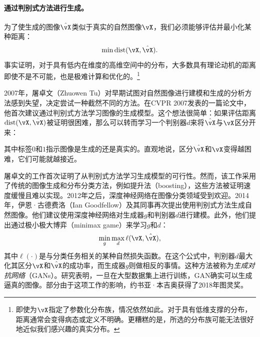 \documentclass[../../book-main_zh.tex]{subfiles}
\begin{document}
\paragraph{通过判别式方法进行生成。}
为了使生成的图像\(\hat{\vX}\)类似于真实的自然图像\(\vX\)，我们必须能够评估并最小化某种距离：
\begin{equation}
    \min \operatorname{dist}(\vX, \hat{\vX}).
\end{equation}
事实证明，对于具有低内在维度的高维空间中的分布，大多数具有理论动机的距离即使不是不可能，也是极难计算和优化的。\footnote{即使为\(\vX\)指定了参数化分布族，情况依然如此。对于具有低维支撑的分布，距离通常会变得病态或定义不明确。更糟糕的是，所选的分布族可能无法很好地近似我们感兴趣的真实分布。}

2007年，屠卓文（Zhuowen Tu）对早期试图对自然图像进行建模和生成的分析方法感到失望，决定尝试一种截然不同的方法。在CVPR
2007发表的一篇论文中\cite{Tu-2007}，他首次建议通过判别式方法学习图像的生成模型。这个想法很简单：如果评估距离\(\operatorname{dist}(\vX,
\hat{\vX})\)被证明很困难，那么可以转而学习一个判别器\(d\)来将\(\hat{\vX}\)与\(\vX\)区分开来：
\begin{figure}[h!]
    \centering
    \label{fig:gan-networks}
\end{figure}
其中标签\(0\)和\(1\)指示图像是生成的还是真实的。直观地说，区分\(\hat{\vX}\)和\(\vX\)变得越困难，它们可能就越接近。

屠卓文的工作\cite{Tu-2007}首次证明了从判别式方法学习生成模型的可行性。然而，该工作采用了传统的图像生成和分布分类方法，例如提升法（boosting），这些方法被证明速度缓慢且难以实现。2012年之后，深度神经网络在图像分类领域受到欢迎。2014年，伊恩·古德费洛（Ian
Goodfellow）及其同事再次提出使用判别式方法生成自然图像\cite{Goodfellow-2014}。他们建议使用深度神经网络对生成器\(g\)和判别器\(d\)进行建模。此外，他们提出通过极小极大博弈（minimax
game）来学习\(g\)和\(d\)：
\begin{equation}
    \min_{g} \max_{d} \ell(\vX, \hat{\vX}),
\end{equation}
其中\(\ell(\cdot)\)是与分类任务相关的某种自然损失函数。在这个公式中，判别器\(d\)最大化其区分\(\vX\)和\(\hat{\vX}\)的成功率，而生成器\(g\)则做相反的事情。这种方法被称为\textit{生成对抗网络}（GANs）。研究表明，一旦在大型数据集上进行训练，GAN确实可以生成逼真的图像。部分由于这项工作的影响，约书亚·本吉奥获得了2018年图灵奖。
\end{document}
